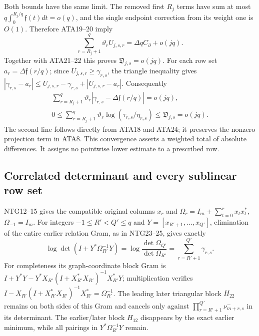 \documentclass[11pt,a4paper]{article}
\begin{document}
Both bounds have the same limit.  The removed first $R_j$ terms have
sum at most $q\int_0^{R_j/q}\mathfrak f(t)dt=o(q)$, and the
single endpoint correction from its weight one is $O(1)$.
Therefore ATA19--20 imply
\[
 \sum_{r=R_j+1}^q\vartheta_rU_{j,s,r}
                      =\Delta qC_\partial+o(jq).
\]
Together with ATA21--22 this proves $\mathfrak D_{j,s}=o(jq)$.
For each row set $a_r=\Delta\mathfrak f(r/q)$; since $U_{j,s,r}\ge
\gamma_{r,s}$, the triangle inequality gives
$|\gamma_{r,s}-a_r|\le U_{j,s,r}-\gamma_{r,s}+|U_{j,s,r}-a_r|$.
Consequently
\[
\begin{gathered}
 \sum_{r=R_j+1}^q\vartheta_r
       |\gamma_{r,s}-\Delta\mathfrak f(r/q)|=o(jq),\\
 0\le\sum_{r=R_j+1}^q\vartheta_r
              \log(\tau_{r,s}/\eta_{r,s})
       \le\mathfrak D_{j,s}=o(jq).
\end{gathered}\tag{ATA25}
\]
The second line follows directly from ATA18 and ATA24; it preserves
the nonzero projection term in ATA8.  This convergence asserts a
weighted total of absolute differences.  It assigns no pointwise
lower estimate to a prescribed row.

\subsection{Correlated determinant and every sublinear row set}
NTG12--15 gives the compatible original columns $x_r$ and
$\Omega_r=I_m+\sum_{t=0}^rx_tx_t^*$, $\Omega_{-1}=I_m$.
For integers $-1\le R'<Q'\le q$ and
$Y=[x_{R'+1},\ldots,x_{Q'}]$, elimination of the entire earlier
relation Gram, as in NTG23--25, gives exactly
\[
 \log\det(I+Y^*\Omega_{R'}^{-1}Y)
 =\log\frac{\det\Omega_{Q'}}{\det\Omega_{R'}}
 =\sum_{r=R'+1}^{Q'}\gamma_{r,s}.                       \tag{ATA26}
\]
For completeness its graph-coordinate block Gram is
$I+Y^*Y-Y^*X_{R'}(I+X_{R'}^*X_{R'})^{-1}X_{R'}^*Y$;
multiplication verifies
$I-X_{R'}(I+X_{R'}^*X_{R'})^{-1}X_{R'}^*=\Omega_{R'}^{-1}$.
The leading later triangular block $H_{22}$ remains on both sides
of this Gram and cancels only against
$\prod_{r=R'+1}^{Q'}\nu^-_{m+r,s}$ in its determinant.
The earlier/later block $H_{12}$ disappears by the exact earlier
minimum, while all pairings in $Y^*\Omega_{R'}^{-1}Y$ remain.
\end{document}
